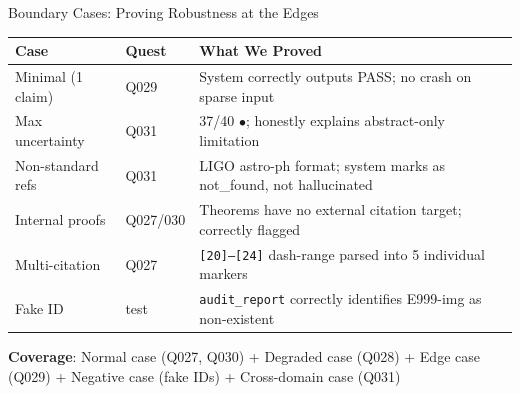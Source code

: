 \documentclass[aspectratio=169,11pt]{beamer}
\begin{document}
\begin{frame}{Boundary Cases: Proving Robustness at the Edges}
  \begin{table}[h]
    \small
    \begin{tabular}{llp{7cm}}
      \toprule
      Case & Quest & What We Proved \\
      \midrule
      Minimal (1 claim) & Q029 & System correctly outputs PASS; no crash on sparse input \\
      Max uncertainty & Q031 & 37/40 \textcolor{yellowRYG}{$\bullet$}; honestly explains abstract-only limitation \\
      Non-standard refs & Q031 & LIGO astro-ph format; system marks as not\_found, not hallucinated \\
      Internal proofs & Q027/030 & Theorems have no external citation target; correctly flagged \\
      Multi-citation & Q027 & \texttt{[20]--[24]} dash-range parsed into 5 individual markers \\
      Fake ID & test & \texttt{audit\_report} correctly identifies E999-img as non-existent \\
      \bottomrule
    \end{tabular}
  \end{table}

  \vspace{0.2cm}
  \begin{center}
    \footnotesize
    \textbf{Coverage}: Normal case (Q027, Q030) + Degraded case (Q028) + Edge case (Q029) + Negative case (fake IDs) + Cross-domain case (Q031)
  \end{center}
\end{frame}
\end{document}
